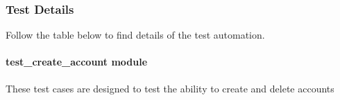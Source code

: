 \documentclass[letterpaper,10pt,english]{sphinxmanual}
\begin{document}
\subsubsection{Test Details}
\label{STD/pytest_test_descriptions:test-details}
Follow the table below to find details of the test automation.


\paragraph{test\_create\_account module}
\label{STD/test_create_account:test-create-account-module}\label{STD/test_create_account::doc}\label{STD/test_create_account:module-test_create_account}
These test cases are designed to test the ability to create and delete accounts
\end{document}
